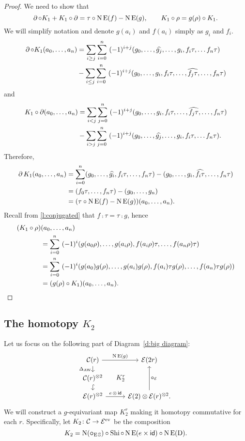 \begin{proof}
	We need to show that
	\[
	\operatorname{\partial} \mathbin{\circ} K_1 + K_1 \mathbin{\circ} \operatorname{\partial} = \tau \mathbin{\circ} \operatorname{N}\operatorname{E}(f) - \operatorname{N}\operatorname{E}(g),
	\qquad
	K_1 \mathbin{\circ} \rho = g(\rho) \mathbin{\circ} K_1.
	\]
	We will simplify notation and denote $g(a_i)$ and $f(a_i)$ simply as $g_i$ and $f_i$.
	\begin{align*}
		\operatorname{\partial} \mathbin{\circ} K_1(a_0,\dots,a_n) &=
		\sum_{i \geq j} \sum_{i=0}^n \ (-1)^{i+j} (g_0, \dots, \widehat{g_j}, \dots, g_i, f_i\tau, \dots f_n \tau) \\ & -
		\sum_{i \leq j} \sum_{i=0}^n \ (-1)^{i+j} (g_0, \dots, g_i, f_i \tau, \dots, \widehat{f_j\tau}, \dots, f_n \tau)
	\end{align*}
	and
	\begin{align*}
		K_1 \mathbin{\circ} \operatorname{\partial}(a_0,\dots,a_n) &=
		\sum_{i<j} \sum_{j=0}^n \ (-1)^{i+j} (g_0, \dots, g_i, f_i\tau, \dots, \widehat{f_j\tau}, \dots, f_n \tau) \\ & -
		\sum_{i > j} \sum_{j=0}^n \ (-1)^{i+j} (g_0, \dots, \widehat{g_j}, \dots, g_i, f_i\tau, \dots f_n \tau).
	\end{align*}
	Therefore,
	\begin{align*}
		\operatorname{\partial} K_1(a_0,\dots,a_n) &=
		\sum_{i=0}^n (g_0, \dots, \widehat{g_i}, f_i\tau, \dots, f_n \tau) -
		(g_0, \dots, g_i, \widehat{f_i\tau}, \dots, f_n \tau) \\ &=
		(f_0\tau, \dots, f_n\tau) - (g_0, \dots, g_n) \\ &=
		(\tau \mathbin{\circ} \operatorname{N}\operatorname{E}(f) - \operatorname{N}\operatorname{E}(g))(a_0,\dots,a_n).
	\end{align*}
	Recall from \cref{l:conjugated} that $f \comp \tau = \tau \comp g$, hence
	\begin{align*}
		(K_1 \mathbin{\circ} \rho) &(a_0,\dots,a_n) \\ &=
		\sum_{i=0}^n \ (-1)^i (g(a_0 \rho), \dots, g(a_i\rho), f(a_i\rho)\tau, \dots, f(a_n\rho) \tau) \\ &=
		\sum_{i=0}^n \ (-1)^i (g(a_0) g(\rho), \dots, g(a_i)g(\rho), f(a_i)\tau g(\rho), \dots, f(a_n)\tau g(\rho)) \\ &=
		(g(\rho) \mathbin{\circ} K_1) (a_0,\dots,a_n).\qedhere
	\end{align*}
\end{proof}

\subsection{The homotopy $K_2$}

Let us focus on the following part of Diagram~\eqref{d:big diagram}:
\[
	\begin{tikzcd}[row sep=small]
		\cC(r)
		\arrow[r,"\chains\EE(g)"]
		\arrow[d,"\Delta_{\AW}"']
		\arrow[ddr,phantom,"K_2^r",shift left=0pt]
		&[5pt] \BE(2r) \\
		\cC(r)^{\ot 2}
		\arrow[d,hook] & \\
		\BE(r)^{\ot 2}
		\arrow[r,"e\, \ot\, \id"]
		& \BE(2) \ot \BE(r)^{\ot 2}.
		\arrow[uu,"\bcomp_\BE"']
	\end{tikzcd}
\]
We will construct a $g$-equivariant map $K_2^r$ making it homotopy commutative for each $r$.
Specifically, let $K_2 \colon \mathcal{C} \to \mathcal{E}^{\mathrm{ev}}$ be the composition
\[
K_2 = \operatorname{N}(\bm{\mathbin{\circ}}_{\operatorname{E}\mathbb{S}}) \mathbin{\circ} \operatorname{Shi} \mathbin{\circ} \operatorname{N}\operatorname{E}(e \times \mathsf{id}) \mathbin{\circ} \operatorname{N}\operatorname{E}(\mathrm{D}).
\]

